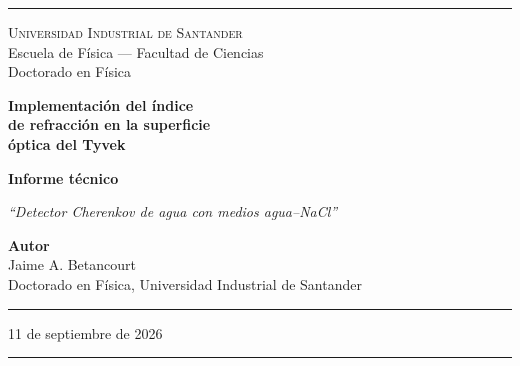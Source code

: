 \documentclass[11pt,a4paper]{article}
\newcommand{\codigo}[1]{\nolinkurl{#1}}
\begin{document}
\pagestyle{empty}


\begin{titlepage}
\begin{center}

\vspace*{0.5cm}
\textcolor{reglaColor}{\rule{\linewidth}{1.2pt}}

\vspace{1.3cm}
{\Large\scshape Universidad Industrial de Santander}\\[0.2cm]
{\large Escuela de Física --- Facultad de Ciencias}\\[0.2cm]
{\large Doctorado en Física}

\vspace{2.2cm}
{\Huge\bfseries\color{tituloColor} Implementación del índice\\[0.2cm]
de refracción en la superficie\\[0.2cm] óptica del Tyvek}

\vspace{1.8cm}
{\large\textbf{Informe técnico}}

\vspace{0.6cm}
\begin{minipage}{0.82\linewidth}
\centering
\textit{``Detector Cherenkov de agua con medios agua--NaCl''}
\end{minipage}

\vfill

{\large\textbf{Autor}}\\[0.15cm]
Jaime A. Betancourt\\[0.1cm]
Doctorado en Física, Universidad Industrial de Santander

\vspace{1.2cm}
\textcolor{reglaColor}{\rule{0.5\linewidth}{0.6pt}}

\vspace{1cm}
11 de septiembre de 2026

\vspace{1cm}
\textcolor{reglaColor}{\rule{\linewidth}{1.2pt}}

\end{center}
\end{titlepage}

\pagestyle{plain}

\begin{abstract}
Este informe documenta la corrección introducida en la representación óptica
del recubrimiento interno de Tyvek del detector Cherenkov de agua. La versión
revisada incorpora la propiedad \codigo{RINDEX} en la tabla
\codigo{linerOpticalPT}, asociada a una superficie
\codigo{dielectric_dielectric} con acabado \codigo{groundbackpainted}. También
se incorporan verificaciones en \codigo{SaltyWCD} para comprobar que tanto el
medio activo como la superficie reflectora contienen las propiedades mínimas
requeridas antes de construir la geometría. La corrección mantiene una única
descripción intrínseca del Tyvek para agua pura y las soluciones con 2.5, 5.0 y
10.0\,\% de NaCl; la dependencia con la concentración entra mediante las
propiedades ópticas del medio activo.
\end{abstract}
\end{document}
